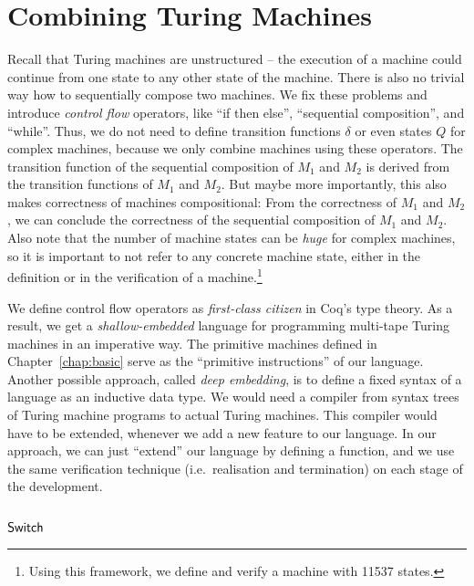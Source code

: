 \chapter{Combining Turing Machines}
\label{chap:combining}

Recall that Turing machines are unstructured -- the execution of a machine could continue from one state to any other state of the machine.  There is
also no trivial way how to sequentially compose two machines.  We fix these problems and introduce \textit{control flow} operators, like ``if then
else'', ``sequential composition'', and ``while''.  Thus, we do not need to define transition functions $\delta$ or even states $Q$ for complex
machines, because we only combine machines using these operators.  The transition function of the sequential composition of $M_1$ and $M_2$ is derived
from the transition functions of $M_1$ and $M_2$.  But maybe more importantly, this also makes correctness of machines compositional: From the
correctness of $M_1$ and $M_2$, we can conclude the correctness of the sequential composition of $M_1$ and $M_2$.  Also note that the number of
machine states can be \textit{huge} for complex machines, so it is important to not refer to any concrete machine state, either in the definition or
in the verification of a machine.\footnote{Using this framework, we define and verify a machine with 11537 states.}

We define control flow operators as \textit{first-class citizen} in Coq's type theory.  As a result, we get a \textit{shallow-embedded} language for
programming multi-tape Turing machines in an imperative way.  The primitive machines defined in Chapter~\ref{chap:basic} serve as the ``primitive
instructions'' of our language.  Another possible approach, called \textit{deep embedding}, is to define a fixed syntax of a language as an inductive
data type.  We would need a compiler from syntax trees of Turing machine programs to actual Turing machines.  This compiler would have to be extended,
whenever we add a new feature to our language.  In our approach, we can just ``extend'' our language by defining a function, and we use the same
verification technique (i.e.\ realisation and termination) on each stage of the development.


\section{$\mathsf{Switch}$}
\label{sec:switch}


